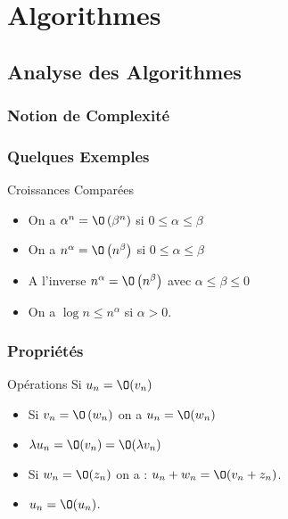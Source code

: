 \documentclass{beamercours}
\begin{document}
\section{Algorithmes}
\subsection{Analyse des Algorithmes}
\begin{frame}
\frametitle{Notion de Complexité}
\end{frame}
\begin{frame}
    \frametitle{Quelques Exemples}
    \begin{propositionfr}{Croissances Comparées}{}
        \begin{itemize}[<+->]
            \item On a $\alpha^{n} = \O\left(\beta^{n}\right)$ si $0 \leq \alpha \leq \beta$
            \item On a $n^{\alpha} = \O\left(n^{\beta}\right)$ si $0 \leq \alpha \leq \beta$
            \item A l'inverse $n^{\alpha} = \O\left(n^{\beta}\right)$ avec $\alpha \leq \beta\leq 0$
            \item On a $\log n \leq n^{\alpha}$ si $\alpha > 0$.
        \end{itemize}
    \end{propositionfr}
\end{frame}

\begin{frame}
    \frametitle{Propriétés}
    \begin{propositionfr}{Opérations}{}
        Si $u_{n} = \O(v_{n})$
        \begin{itemize}
            \item<2-> Si $v_{n} = \O\left(w_{n}\right)$ on a $u_{n} = \O(w_{n})$
            \item<3-> $\lambda u_{n} = \O(v_{n}) = \O(\lambda v_{n})$
            \item<4-> Si $w_{n} = \O(z_{n})$ on a : $u_{n} + w_{n} = \O(v_{n} + z_{n})$.
            \item<5-> $u_{n} = \O(u_{n})$.
        \end{itemize}
    \end{propositionfr}
\end{frame}
\end{document}
